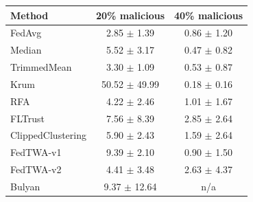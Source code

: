 \begin{tabular}{lcc}
\toprule
Method & 20\% malicious & 40\% malicious \\
\midrule
FedAvg & 2.85 $\pm$ 1.39 & 0.86 $\pm$ 1.20 \\
Median & 5.52 $\pm$ 3.17 & 0.47 $\pm$ 0.82 \\
TrimmedMean & 3.30 $\pm$ 1.09 & 0.53 $\pm$ 0.87 \\
Krum & 50.52 $\pm$ 49.99 & 0.18 $\pm$ 0.16 \\
RFA & 4.22 $\pm$ 2.46 & 1.01 $\pm$ 1.67 \\
FLTrust & 7.56 $\pm$ 8.39 & 2.85 $\pm$ 2.64 \\
ClippedClustering & 5.90 $\pm$ 2.43 & 1.59 $\pm$ 2.64 \\
FedTWA-v1 & 9.39 $\pm$ 2.10 & 0.90 $\pm$ 1.50 \\
FedTWA-v2 & 4.41 $\pm$ 3.48 & 2.63 $\pm$ 4.37 \\
Bulyan & 9.37 $\pm$ 12.64 & n/a \\
\bottomrule
\end{tabular}